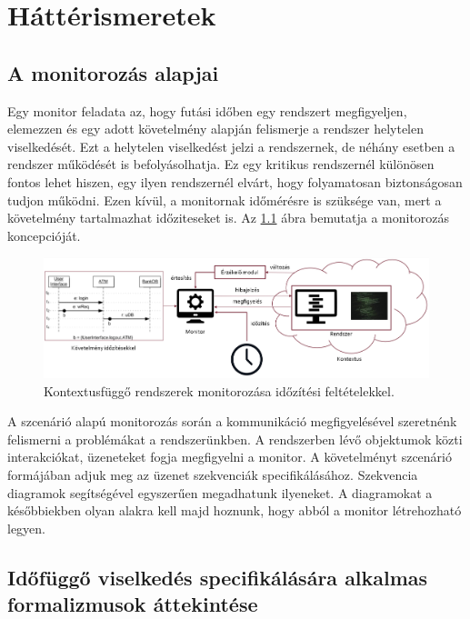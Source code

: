 \chapter{Háttérismeretek}\section{A monitorozás alapjai}

Egy monitor feladata az, hogy futási időben egy rendszert megfigyeljen, elemezzen és egy adott követelmény alapján felismerje a rendszer helytelen viselkedését.
Ezt a helytelen viselkedést jelzi a rendszernek, de néhány esetben a rendszer működését is befolyásolhatja.
Ez egy kritikus rendszernél különösen fontos lehet hiszen, egy ilyen rendszernél elvárt, hogy folyamatosan biztonságosan tudjon működni.
Ezen kívül, a monitornak időmérésre is szüksége van, mert a követelmény tartalmazhat időziteseket is.
Az \ref{introductory_figure} ábra bemutatja a monitorozás koncepcióját.

\begin{figure}[!ht]
    \includegraphics[width=150mm, keepaspectratio]{figures/introductory_figure.png}
    \caption{Kontextusfüggő rendszerek monitorozása időzítési feltételekkel.}
    \label{introductory_figure}
\end{figure}

A szcenárió alapú monitorozás során a kommunikáció megfigyelésével szeretnénk felismerni a problémákat a rendszerünkben.
A rendszerben lévő objektumok közti interakciókat, üzeneteket fogja megfigyelni a monitor.
A követelményt szcenárió formájában adjuk meg az üzenet szekvenciák specifikálásához.
Szekvencia diagramok segítségével egyszerűen megadhatunk ilyeneket.
A diagramokat a későbbiekben olyan alakra kell majd hoznunk, hogy abból a monitor létrehozható legyen.

\clearpage\section{Időfüggő viselkedés specifikálására alkalmas formalizmusok áttekintése}
